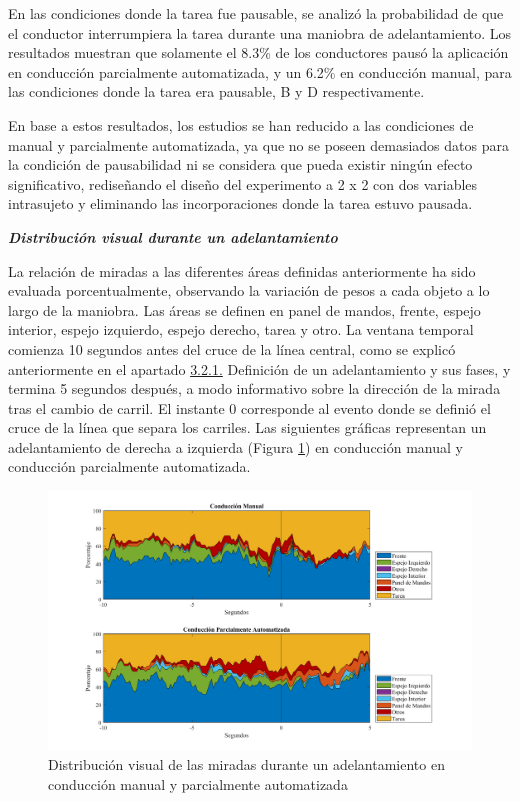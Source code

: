 En las condiciones donde la tarea fue pausable, se analizó la probabilidad de que el conductor interrumpiera la tarea durante una maniobra de adelantamiento. Los resultados muestran que solamente el 8.3\% de los conductores pausó la aplicación en conducción parcialmente automatizada, y un 6.2\% en conducción manual, para las condiciones donde la tarea era pausable, B y D respectivamente.

En base a estos resultados, los estudios se han reducido a las condiciones de manual y parcialmente automatizada, ya que no se poseen demasiados datos para la condición de pausabilidad ni se considera que pueda existir ningún efecto significativo, rediseñando el diseño del experimento a 2 x 2 con dos variables intrasujeto y eliminando las incorporaciones donde la tarea estuvo pausada.

\textbf{\emph{Distribución visual durante un adelantamiento}}\label{3231}

La relación de miradas a las diferentes áreas definidas anteriormente ha sido evaluada porcentualmente, observando la variación de pesos a cada objeto a lo largo de la maniobra. Las áreas se definen en panel de mandos, frente, espejo interior, espejo izquierdo, espejo derecho, tarea y otro. La ventana temporal comienza 10 segundos antes del cruce de la línea central, como se explicó anteriormente en el apartado \hyperref[321]{3.2.1.} Definición de un adelantamiento y sus fases, y termina 5 segundos después, a modo informativo sobre la dirección de la mirada tras el cambio de carril. El instante 0 corresponde al evento donde se definió el cruce de la línea que separa los carriles. Las siguientes gráficas representan un adelantamiento de derecha a izquierda (Figura \ref{fig:3.19}) en conducción manual y conducción parcialmente automatizada. 

\begin{figure}[h]
    \centering
    \includegraphics[width=16cm]
    {figures/3.19.png}
    \caption{ \label{fig:3.19} Distribución visual de las miradas durante un adelantamiento en conducción manual y parcialmente automatizada}
\end{figure}

